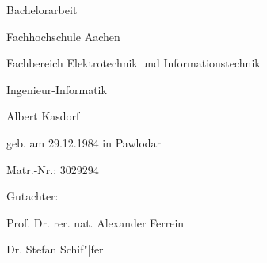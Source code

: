 %
%
% 
\begin{titlepage}
	\newlength
	\logoheight
	\settoheight
	\thispagestyle{empty}

	\vspace*{\fill}
	\centering
	\Huge
	\thetitle\par
	\normalsize
	Bachelorarbeit\par
	\vspace{0.25cm}
	\normalsize
	Fachhochschule Aachen\par
	Fachbereich Elektrotechnik und Informationstechnik\par
	Ingenieur-Informatik\par
	\vspace{0.5cm}
	Albert Kasdorf\par
	geb. am 29.12.1984 in Pawlodar\par
	Matr.-Nr.: 3029294\par
	\vspace{0.5cm}
	Gutachter:\par
	Prof. Dr. rer. nat. Alexander Ferrein\par
	Dr. Stefan Schif"|fer\par
	\vspace{\fill}
\end{titlepage}